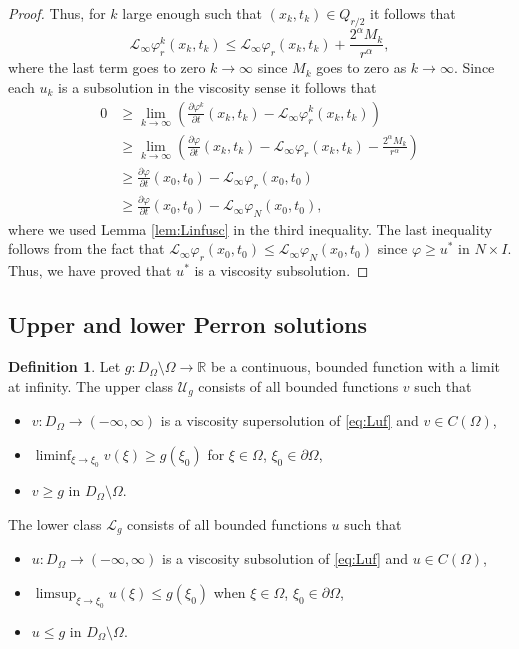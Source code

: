 \documentclass[11pt]{article}
\newcommand{\R}{\mathbb{R}}
\providecommand{\Linf}{\mathcal{L}_{\infty}}
\providecommand{\Ns}{N \times I}
\providecommand{\Rnp}{D_{\Omega}}
\providecommand{\RnpO}{D_{\Omega}\setminus \Omega}
\numberwithin{equation}{section}
\theoremstyle{definition}
\newtheorem{definition}[thm]{Definition}
\begin{document}
\begin{proof}
Thus, for $k$ large enough such that $(x_k,t_k) \in Q_{r/2}$ it follows that
\begin{equation*}
    \Linf \varphi^k_{r}(x_k,t_k) \leq \Linf \varphi_{r}(x_k,t_k)+ \frac{2^{\alpha} M_k}{r^{\alpha}},
\end{equation*}
where the last term goes to zero $k \to \infty$ since $M_k$ goes to zero as $k \to \infty$. Since each $u_k$ is a subsolution in the viscosity sense it follows that
    \begin{align*}
       0 &\geq \lim_{k \to \infty} \left(\frac{\partial \varphi^k}{\partial t}(x_k, t_k) - \Linf \varphi_{r }^k(x_k, t_k) \right)\\
       &\geq \lim_{k \to \infty} \left(\frac{\partial \varphi}{\partial t}(x_k, t_k) - \Linf \varphi_{r }(x_k, t_k) -\frac{2^{\alpha} M_k}{r^{\alpha}}\right)\\
       &\geq \frac{\partial \varphi}{\partial t}(x_0, t_0) - \Linf \varphi_{r}(x_0, t_0)\\
       & \geq  \frac{\partial \varphi}{\partial t}(x_0, t_0) - \Linf \varphi_{N }(x_0, t_0),
    \end{align*}
where we used Lemma \ref{lem:Linfusc} in the third inequality. The last inequality follows from the fact that $\Linf \varphi_{r }(x_0, t_0) \leq  \Linf \varphi_{N }(x_0, t_0)$ since $\varphi \geq u^*$ in $\Ns$. Thus, we have proved that $u^*$ is a viscosity subsolution.
\end{proof}

\subsection{Upper and lower Perron solutions}

\begin{definition}\label{def:upperlowerclass}
Let $g:\RnpO \to \R$ be a continuous, bounded function with a limit at infinity. The upper class $\mathcal{U}_g$ consists of all bounded functions $v$ such that 
\begin{itemize}
    \item $v:\Rnp \to (-\infty,\infty)$ is a viscosity supersolution of \eqref{eq:Luf} and $v \in C(\Omega)$,
    \item $\liminf_{\xi \to \xi_0} v(\xi) \geq g(\xi_0)$ for $\xi \in \Omega$, $\xi_0 \in \partial \Omega$, 
    \item  $v \geq g$ in $\Rnp \setminus \Omega$.
\end{itemize} 
 The lower class $\mathcal{L}_g$ consists of all bounded functions $u$ such that 
\begin{itemize}
    \item $u:\Rnp \to (-\infty,\infty)$ is a viscosity subsolution of \eqref{eq:Luf} and $u \in C(\Omega)$,
    \item$\limsup_{\xi \to \xi_0} u(\xi) \leq g(\xi_0)$ when $\xi \in \Omega$, $\xi_0 \in \partial \Omega$,
    \item  $u \leq g$ in $\Rnp \setminus \Omega$.
\end{itemize}
\end{definition}
\end{document}

